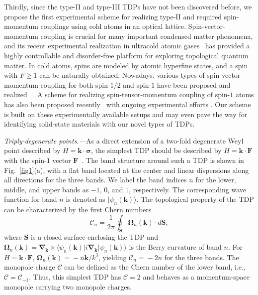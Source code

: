 \documentclass[aps,prl,floatfix,twocolumn,reprint]{revtex4}
\begin{document}
Thirdly, since the type-II and type-III TDPs have not been discovered before, we
propose the first experimental scheme for realizing type-II and required
spin-momentum couplings using cold atoms in an optical lattice.
Spin-vector-momentum coupling is crucial for many important condensed matter
phenomena, and its recent experimental realization in ultracold atomic 
gases~\cite{1dsoc1,1dsoc2,1dsoc3,1dsoc4,1dsoc5,1dsoc6,1dsoc7,soc2,soc3,1dsoc8,soc1,spintensor1}%
has provided a highly controllable and disorder-free platform for exploring
topological quantum matter. In cold atoms, spins are modeled by atomic
hyperfine states, and a spin with $F\!\geq \!1$ can be naturally obtained.
Nowadays, various types of spin-vector-momentum coupling for both spin-$1/2$
and spin-$1$ have been proposed and realized~\cite%
{1dsoc1,1dsoc2,1dsoc3,1dsoc4,1dsoc5,1dsoc6,1dsoc7,soc2,soc3,1dsoc8,soc1,3dsoc1,lxj,spintensor1,Wu2016}%
. A scheme for realizing spin-tensor-momentum coupling of spin-$1$ atoms has
also been proposed recently~\cite{spintensor2} with ongoing experimental
efforts \cite{STMCexp}. Our scheme is built on these experimentally
available setups \cite{soc1,lxj} and may even pave the way for identifying
solid-state materials with our novel types of TDPs.

{\color{blue}\textit{Triply-degenerate points.---}}As a direct extension of
a two-fold degenerate Weyl point described by $H=\bm k\cdot \bm{\sigma }$,
the simplest TDP should be described by $H=\bm k\cdot \bm F$ with the spin-$%
1 $ vector $\bm F$~\cite%
{tf1,tf2,tf3,tf4,tf5,tf6,tf7,tf8,tf9,tf10,tf11,tf12,tf13}. The band
structure around such a TDP is shown in Fig.~\ref{fig1}(a), with a flat band located at the center and linear dispersions along all
directions for the three bands. We label the band indices $n$ for the
lower, middle, and upper bands as $-1$, $0$, and $1$, respectively. The corresponding wave function for band $n$ is denoted as $|\psi_n(\bm k)\rangle$.
The topological property of the TDP can be characterized by the first Chern numbers
\begin{equation}
\mathcal{C}_{n}=\frac{1}{2\pi }\oint_{\bm{S}}\bm{\Omega }_{n}(\bm{k})\cdot d%
\bm{S},  \label{topoinvariant}
\end{equation}%
where $\bm{S}$ is a closed surface enclosing the TDP 
and $\bm{\Omega }_{n}(\bm{k})\!=\!\bm{\nabla }_{\bm{k}}\times \langle
\psi _{n}(\bm{k})|i\bm{\nabla }_{\bm{k}}|\psi _{n}(\bm{k})\rangle $ is the
Berry curvature of band $n$. For $H\!=\!\bm{k}\cdot \bm{F}$, $\bm{\Omega }%
_{n}(\bm{k})\!=\!-n\bm{k/}k^{3}$, yielding $\mathcal{C}_{n}\!=\!-2n$ for
the three bands. The monopole charge $\mathcal{C}$ can be defined as the Chern
number of the lower band, i.e., $\mathcal{C}\!=\!\mathcal{C}_{-1}$. 
Thus, this simplest TDP has $\mathcal{C}=2$ and behaves as a
momentum-space monopole carrying two monopole charges.
\end{document}
